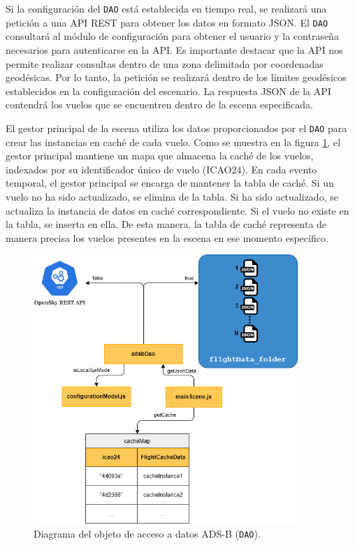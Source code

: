 \documentclass[a4paper, 11pt]{book}
\begin{document}
Si la configuración del \texttt{DAO} está establecida en tiempo real, se realizará una petición a una \textsc{API REST} para obtener los datos en formato \textsc{JSON}. El \texttt{DAO} consultará al módulo de configuración para obtener el usuario y la contraseña necesarios para autenticarse en la \textsc{API}. Es importante destacar que la API nos permite realizar consultas dentro de una zona delimitada por coordenadas geodésicas. 
Por lo tanto, la petición se realizará dentro de los límites geodésicos establecidos en la configuración del escenario. La respuesta \textsc{JSON} de la \textsc{API} contendrá los vuelos que se encuentren dentro de la escena especificada.

El gestor principal de la escena utiliza los datos proporcionados por el \texttt{DAO} para crear las instancias en caché de cada vuelo. Como se muestra en la figura \ref{fig:dao}, el gestor principal mantiene un mapa que almacena la caché de los vuelos, indexados por su identificador único de vuelo (\textsc{ICAO24}). En cada evento temporal, el gestor principal se encarga de mantener la tabla de caché. Si un vuelo no ha sido actualizado, se elimina de la tabla. Si ha sido actualizado, se actualiza la instancia de datos en caché correspondiente. Si el vuelo no existe en la tabla, se inserta en ella. De esta manera, la tabla de caché representa de manera precisa los vuelos presentes en la escena en ese momento específico.

\begin{figure}[h]
  \centering
  \includegraphics[width=10cm, keepaspectratio]{img/adsbDao.png}
  \caption{Diagrama del objeto de acceso a datos \textsc{ADS-B} (\texttt{DAO}).}
  \label{fig:dao}
\end{figure}
\end{document}
